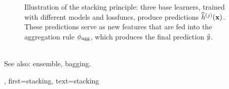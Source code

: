 {{\begin{figure}[htbp]
\begin{center}
		\caption{
		Illustration of the stacking principle: three base learners, trained with 
		different \glspl{model} and \glspl{lossfunc}, produce \glspl{prediction}  
		$\widehat{h}^{(j)}({\bf x})$. These \glspl{prediction} 
	    serve as new \glspl{feature} that are fed into 
		the aggregation rule $\phi_{\rm agg}$, which produces the final \gls{prediction} 
		$\hat{y}$.}
		\end{center}
		\end{figure}
		\\
	 	See also: \gls{ensemble}, \gls{bagging}.},
	 first={stacking},
	 text={stacking} 
}

